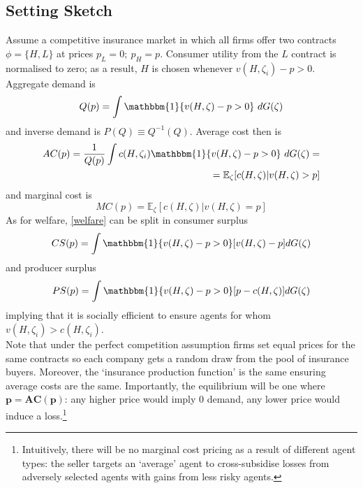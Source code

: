 \documentclass[11pt]{article}
\numberwithin{equation}{section}
\begin{document}
\subsection{Setting Sketch}
Assume a competitive insurance market in which all firms offer two contracts $\phi = \{H,L\}$ at prices $p_L = 0; ~p_H=p$. Consumer utility from the $L$ contract is normalised to zero; as a result, $H$ is chosen whenever $v(H, \zeta_i) - p > 0$. Aggregate demand is
\begin{equation}
	Q(p) = \int \mathbbm{1}\{v(H, \zeta) - p > 0\} ~d G(\zeta)
\end{equation}
and inverse demand is $P(Q) \equiv Q^{-1}(Q)$. Average cost then is
\begin{equation}
\begin{split}
AC(p) = \frac{1}{Q(p)} \int c(H, \zeta_i) \mathbbm{1}\{v(H, \zeta) - p > 0\} ~d G(\zeta) = \\ = \mathbb{E}_\zeta [c(H, \zeta)| v(H, \zeta) > p]
\end{split}
\end{equation}
and marginal cost is
\begin{equation}
MC(p) = \mathbb{E}_\zeta [c(H, \zeta)| v(H, \zeta) = p]
\end{equation}
As for welfare, \eqref{welfare} can be split in consumer surplus
\begin{equation}
	CS(p) = \int \mathbbm{1}\{v(H, \zeta) - p > 0\}[v(H, \zeta) - p] dG(\zeta)
\end{equation}
and producer surplus
\begin{equation}
PS(p) = \int \mathbbm{1}\{v(H, \zeta) - p > 0\}[p - c(H, \zeta)] dG(\zeta)
\end{equation}
implying that it is socially efficient to ensure agents for whom $v(H, \zeta_i) > c(H,\zeta_i)$. \\

Note that under the perfect competition assumption firms set equal prices for the same contracts so each company gets a random draw from the pool of insurance buyers. Moreover, the `insurance production function' is the same ensuring average costs are the same. Importantly, the equilibrium will be one where $\mathbf{p = AC(p)}$: any higher price would imply 0 demand, any lower price would induce a loss.\footnote{Intuitively, there will be no marginal cost pricing as a result of different agent types: the seller targets an `average' agent to cross-subsidise losses from adversely selected agents with gains from less risky agents.}
\end{document}
